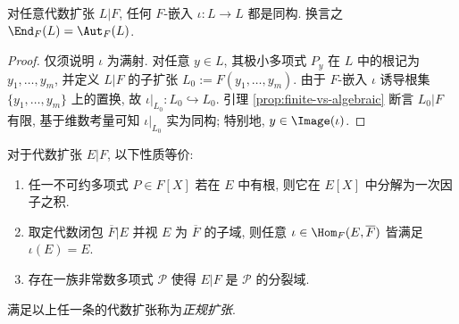 \begin{lemma}\label{prop:alg-ext-endomorphism}
	对任意代数扩张 $L|F$, 任何 $F$-嵌入 $\iota: L \to L$ 都是同构. 换言之 $\End_F(L)=\Aut_F(L)$.
\end{lemma}
\begin{proof}
	仅须说明 $\iota$ 为满射. 对任意 $y \in L$, 其极小多项式 $P_y$ 在 $L$ 中的根记为 $y_1, \ldots, y_m$, 并定义 $L|F$ 的子扩张 $L_0 := F(y_1, \ldots, y_m)$. 由于 $F$-嵌入 $\iota$ 诱导根集 $\{y_1, \ldots, y_m\}$ 上的置换, 故 $\iota|_{L_0}: L_0 \hookrightarrow L_0$. 引理 \ref{prop:finite-vs-algebraic} 断言 $L_0|F$ 有限, 基于维数考量可知 $\iota|_{L_0}$ 实为同构; 特别地, $y \in \Image(\iota)$.
\end{proof}

\begin{definition-theorem}\label{def:normal-ext}
	对于代数扩张 $E|F$, 以下性质等价:
	\begin{enumerate}[\bfseries {N}.1]
		\item 任一不可约多项式 $P \in F[X]$ 若在 $E$ 中有根, 则它在 $E[X]$ 中分解为一次因子之积.
		\item 取定代数闭包 $\overline{F}|E$ 并视 $E$ 为 $\overline{F}$ 的子域, 则任意 $\iota \in \Hom_F(E, \overline{F})$ 皆满足 $\iota(E)=E$.
		\item 存在一族非常数多项式 $\mathcal{P}$ 使得 $E|F$ 是 $\mathcal{P}$ 的分裂域.
	\end{enumerate}
	满足以上任一条的代数扩张称为\emph{正规扩张}.
\end{definition-theorem}
